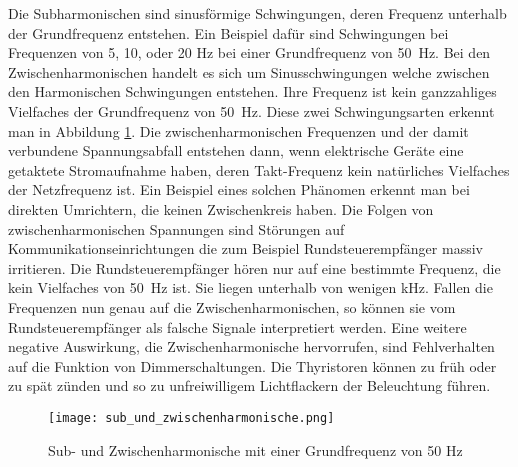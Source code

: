Die Subharmonischen sind sinusförmige Schwingungen, deren Frequenz unterhalb der Grundfrequenz entstehen. Ein Beispiel dafür sind Schwingungen bei Frequenzen von 5, 10, oder 20 Hz bei einer Grundfrequenz von \SI{50}{Hz}. Bei den Zwischenharmonischen handelt es sich um Sinusschwingungen welche zwischen den Harmonischen Schwingungen entstehen. Ihre Frequenz ist kein ganzzahliges Vielfaches der Grundfrequenz von \SI{50}{Hz}. Diese zwei Schwingungsarten erkennt man in Abbildung \ref{fig:Sub und Zwischenharmonische}. Die zwischenharmonischen Frequenzen und der damit verbundene Spannungsabfall entstehen dann, wenn elektrische Geräte eine getaktete Stromaufnahme haben, deren Takt-Frequenz kein natürliches Vielfaches der Netzfrequenz ist. Ein Beispiel eines solchen Phänomen erkennt man bei direkten Umrichtern, die keinen Zwischenkreis haben. Die Folgen von zwischenharmonischen Spannungen sind Störungen auf Kommunikationseinrichtungen die zum Beispiel Rundsteuerempfänger massiv irritieren. Die Rundsteuerempfänger hören nur auf eine bestimmte Frequenz, die kein Vielfaches von \SI{50}{Hz} ist. Sie liegen unterhalb von wenigen kHz. Fallen die Frequenzen nun genau auf die Zwischenharmonischen, so können sie vom Rundsteuerempfänger als falsche Signale interpretiert werden. Eine weitere negative Auswirkung, die Zwischenharmonische hervorrufen, sind Fehlverhalten auf die Funktion von Dimmerschaltungen. Die Thyristoren können zu früh oder zu spät zünden und so zu unfreiwilligem Lichtflackern der Beleuchtung führen. 

\begin{figure}[ht!]
	\centering
	\texttt{[image: sub\_und\_zwischenharmonische.png]}	
	\caption{Sub- und Zwischenharmonische mit einer Grundfrequenz von 50 Hz}
	\label{fig:Sub und Zwischenharmonische}
\end{figure}

\newpage
